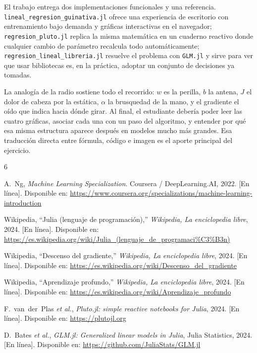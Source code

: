 \documentclass[11pt,a4paper]{article}
\begin{document}
El trabajo entrega dos implementaciones funcionales y una referencia. \texttt{lineal\_regresion\_guinativa.jl} ofrece una experiencia de escritorio con entrenamiento bajo demanda y gr\'aficas interactivas en el navegador; \texttt{regresion\_pluto.jl} replica la misma matem\'atica en un cuaderno reactivo donde cualquier cambio de par\'ametro recalcula todo autom\'aticamente; \texttt{regresion\_lineal\_libreria.jl} resuelve el problema con \texttt{GLM.jl} y sirve para ver que usar bibliotecas es, en la pr\'actica, adoptar un conjunto de decisiones ya tomadas.

La analog\'ia de la radio sostiene todo el recorrido: $w$ es la perilla, $b$ la antena, $J$ el dolor de cabeza por la est\'atica, $\alpha$ la brusquedad de la mano, y el gradiente el o\'ido que indica hacia d\'onde girar. Al final, el estudiante deber\'ia poder leer las cuatro gr\'aficas, asociar cada una con un paso del algoritmo, y entender por qu\'e esa misma estructura aparece despu\'es en modelos mucho m\'as grandes. Esa traducci\'on directa entre f\'ormula, c\'odigo e imagen es el aporte principal del ejercicio.

\begin{thebibliography}{6}

A.~Ng, \textit{Machine Learning Specialization}. Coursera / DeepLearning.AI, 2022. [En l\'inea]. Disponible en: \url{https://www.coursera.org/specializations/machine-learning-introduction}

Wikipedia, ``Julia (lenguaje de programaci\'on),'' \textit{Wikipedia, La enciclopedia libre}, 2024. [En l\'inea]. Disponible en: \url{https://es.wikipedia.org/wiki/Julia_(lenguaje_de_programaci%C3%B3n)}

Wikipedia, ``Descenso del gradiente,'' \textit{Wikipedia, La enciclopedia libre}, 2024. [En l\'inea]. Disponible en: \url{https://es.wikipedia.org/wiki/Descenso_del_gradiente}

Wikipedia, ``Aprendizaje profundo,'' \textit{Wikipedia, La enciclopedia libre}, 2024. [En l\'inea]. Disponible en: \url{https://es.wikipedia.org/wiki/Aprendizaje_profundo}

F.~van~der~Plas \textit{et al.}, \textit{Pluto.jl: simple reactive notebooks for Julia}, 2024. [En l\'inea]. Disponible en: \url{https://plutojl.org}

D.~Bates \textit{et al.}, \textit{GLM.jl: Generalized linear models in Julia}, Julia Statistics, 2024. [En l\'inea]. Disponible en: \url{https://github.com/JuliaStats/GLM.jl}

\end{thebibliography}
\end{document}
